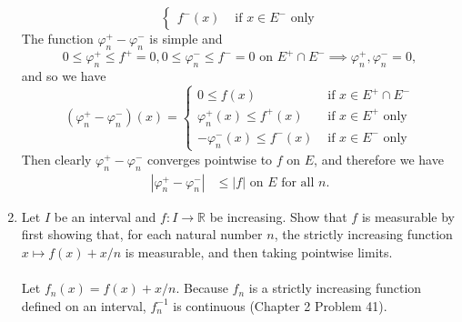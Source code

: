 \begin{enumerate}
\[\begin{cases}
            f^-(x)&\text{ if }x\in E^-\text{ only}
        \end{cases}    
    \]
    The function $\varphi^+_n-\varphi^-_n$ is simple and
    \[
        0\le\varphi^+_n\le f^+=0, 0\le\varphi^-_n\le f^-=0\text{ on }E^+\cap E^-\implies\varphi^+_n,\varphi^-_n =0,
    \]
    and so we have
    \[
        (\varphi^+_n-\varphi^-_n)(x)=
        \begin{cases}
            0\le f(x)&\text{ if }x\in E^+\cap E^-\\
            \varphi^+_n(x)\le f^+(x)&\text{ if }x\in E^+\text{ only}\\
            -\varphi^-_n(x)\le f^-(x)&\text{ if }x\in E^-\text{ only}
        \end{cases}    
    \]
    Then clearly $\varphi^+_n-\varphi^-_n$ converges pointwise to $f$ on $E$, and therefore we have
    \begin{align*}
        |\varphi^+_n-\varphi^-_n|&\le|f|\text{ on }E\text{ for all }n.
    \end{align*}
    \item Let $I$ be an interval and $f:I\to\mathbb{R}$ be increasing. Show that $f$ is measurable by first showing that, for each natural number $n$, the strictly increasing function $x\mapsto f(x)+x/n$ is measurable, and then taking pointwise limits.\\
    \\Let $f_n(x)=f(x)+x/n$.
    Because $f_n$ is a strictly increasing function defined on an interval, $f_n^{-1}$ is continuous (Chapter 2 Problem 41).
\end{enumerate}

